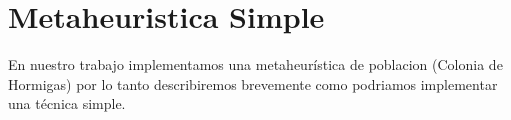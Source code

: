 \section{Metaheuristica Simple}
\label{sec:intro}

En nuestro trabajo implementamos una metaheurística de poblacion (Colonia de Hormigas) 
por lo tanto describiremos brevemente como podriamos implementar una técnica 
simple. 



